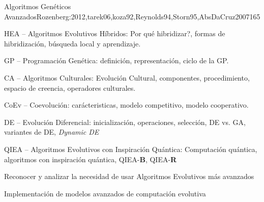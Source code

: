 \begin{syllabus}
\begin{unit}{Algoritmos Genéticos Avanzados}{Rozenberg:2012,tarek06,koza92,Reynolds94,Storn95,AbsDaCruz2007}{16}{5}
\begin{topics}
      \item HEA -- Algoritmos Evolutivos Híbridos: Por qué hibridizar?, formas de hibridización, búsqueda local y aprendizaje.
      \item GP -- Programación Genética: definición, representación, ciclo de la GP. 
      \item CA -- Algoritmos Culturales: Evolución Cultural, componentes, procedimiento, espacio de creencia, operadores culturales.
      \item CoEv -- Coevolución: carácteristicas, modelo competitivo, modelo cooperativo.
      \item DE -- Evolución Diferencial: inicialización, operaciones, selección, DE vs. GA, variantes de DE, \textit{Dynamic DE}
      \item QIEA -- Algoritmos Evolutivos con Inspiración Quántica: Computación quántica, algoritmos con inspiración quántica, QIEA-\textbf{B}, QIEA-\textbf{R}
\end{topics}
\begin{learningoutcomes}
  \item Reconocer y analizar la necesidad de usar Algoritmos Evolutivos más avanzados
  \item Implementación de modelos avanzados de computación evolutiva
\end{learningoutcomes}
\end{unit}



\begin{coursebibliography}
\end{coursebibliography}

\end{syllabus}
